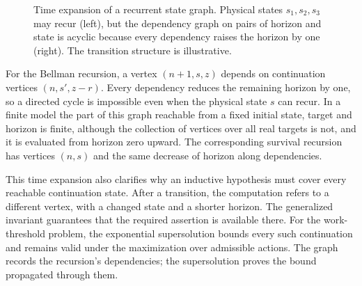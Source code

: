 \documentclass[11pt]{article}
\theoremstyle{definition}
\theoremstyle{remark}
\begin{document}
\begin{figure}[tbp]
{
}
\caption{Time expansion of a recurrent state graph. Physical states $s_1, s_2, s_3$ may recur (left), but the dependency graph on pairs of horizon and state is acyclic because every dependency raises the horizon by one (right). The transition structure is illustrative.}
\label{fig:bellman}
\end{figure}

For the Bellman recursion, a vertex $(n+1,s,z)$ depends on
continuation vertices $(n,s',z-r)$. Every dependency reduces the
remaining horizon by one, so a directed cycle is impossible even
when the physical state $s$ can recur. In a finite model the part of this graph reachable from a fixed initial state, target and horizon is finite, although the collection of vertices over all real targets is not, and it is evaluated from horizon zero upward. The
corresponding survival recursion has vertices $(n,s)$ and the same
decrease of horizon along dependencies.

This time expansion also clarifies why an inductive hypothesis must
cover every reachable continuation state. After a transition, the
computation refers to a different vertex, with a changed state and a
shorter horizon. The generalized invariant guarantees that the
required assertion is available there. For the work-threshold
problem, the exponential supersolution bounds every such
continuation and remains valid under the maximization over
admissible actions. The graph records the recursion's dependencies;
the supersolution proves the bound propagated through them.
\end{document}
